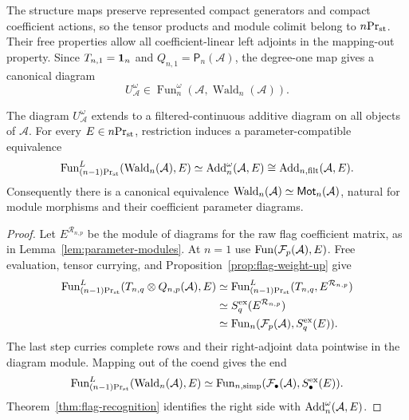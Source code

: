 The structure maps preserve represented compact generators and
compact coefficient actions, so the tensor products and module
colimit belong to ${n}\mathrm{Pr}_{\mathrm{st}}$. Their free properties allow all
coefficient-linear left adjoints in the mapping-out property.
Since $T_{n,1}=\mathbf 1_n$ and $Q_{n,1}=\mathsf P_n(\mathcal A)$,
the degree-one map gives a
canonical diagram
\[
 U^\omega_{\mathcal A}\in
 \operatorname{Fun}_n^\omega(\mathcal A,
                    \operatorname{Wald}_n(\mathcal A)).
\]

\begin{theorem}\label{thm:weighted-s-universal}
The diagram $U^\omega_{\mathcal A}$ extends to a filtered-continuous additive
diagram on all objects of $\mathcal A$. For every $E\in{n}\mathrm{Pr}_{\mathrm{st}}$,
restriction induces a parameter-compatible equivalence
\begin{equation}\label{eq:weighted-s-universal}
 \operatorname{Fun}^L_{{(n-1)}\mathrm{Pr}_{\mathrm{st}}}(\operatorname{Wald}_n(\mathcal A),E)
       \simeq\operatorname{Add}_{n}^\omega(\mathcal A,E)\cong\operatorname{Add}_{n,\mathrm{filt}}(\mathcal A,E).
\end{equation}
Consequently there is a canonical equivalence
$\operatorname{Wald}_n(\mathcal A)\simeq\mathsf{Mot}_n(\mathcal A)$, natural
for module morphisms and their coefficient parameter diagrams.
\end{theorem}

\begin{proof}
Let $E^{\mathcal R_{n,p}}$ be the module of diagrams for the raw
flag coefficient matrix, as in Lemma~\ref{lem:parameter-modules}.
At $n=1$ use $\operatorname{Fun}(\mathcal F_p(\mathcal A),E)$.
Free evaluation, tensor currying, and
Proposition~\ref{prop:flag-weight-up} give
\[
\begin{aligned}
 \operatorname{Fun}^L_{{(n-1)}\mathrm{Pr}_{\mathrm{st}}}
    (T_{n,q}\otimes Q_{n,p}(\mathcal A),E)&\simeq\operatorname{Fun}^L_{{(n-1)}\mathrm{Pr}_{\mathrm{st}}}(T_{n,q},E^{\mathcal R_{n,p}})\\
 &\simeq S_q^{\mathrm{ex}}(E^{\mathcal R_{n,p}})\\
 &\simeq\operatorname{Fun}_n
       (\mathcal F_p(\mathcal A),S_q^{\mathrm{ex}}(E)).
\end{aligned}
\]
The last step curries complete rows and their right-adjoint data
pointwise in the diagram module.
Mapping out of the coend gives the end
\[
 \operatorname{Fun}^L_{{(n-1)}\mathrm{Pr}_{\mathrm{st}}}(\operatorname{Wald}_n(\mathcal A),E)
 \simeq\operatorname{Fun}_{n,\mathrm{simp}}
      (\mathcal F_\bullet(\mathcal A),S_\bullet^{\mathrm{ex}}(E)).
\]
Theorem~\ref{thm:flag-recognition} identifies the right side with
$\operatorname{Add}_n^\omega(\mathcal A,E)$.
\end{proof}
